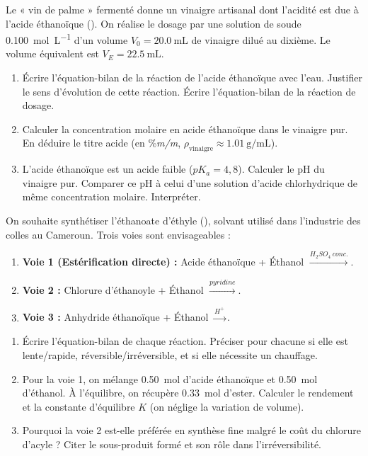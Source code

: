 \documentclass[11pt]{article}
\begin{document}
\begin{exercice}
Le « vin de palme » fermenté donne un vinaigre artisanal dont l'acidité est due à l'acide éthanoïque (). On réalise le dosage par une solution de soude  \SI{0,100}{\mol\per\liter} d'un volume $V_0 = \SI{20,0}{\milli\liter}$ de vinaigre dilué au dixième. Le volume équivalent est $V_E = \SI{22,5}{\milli\liter}$.
\begin{enumerate}
    \item Écrire l'équation-bilan de la réaction de l'acide éthanoïque avec l'eau. Justifier le sens d'évolution de cette réaction. Écrire l'équation-bilan de la réaction de dosage.
    \item Calculer la concentration molaire en acide éthanoïque dans le vinaigre pur. En déduire le titre acide (en \%\textit{m/m}, $\rho_{\text{vinaigre}} \approx \SI{1,01}{\gram\per\milli\liter}$).
    \item L'acide éthanoïque est un acide faible ($pK_a = 4,8$). Calculer le pH du vinaigre pur. Comparer ce pH à celui d'une solution d'acide chlorhydrique de même concentration molaire. Interpréter.
\end{enumerate}
\end{exercice}

\begin{exercice}
On souhaite synthétiser l'éthanoate d'éthyle (), solvant utilisé dans l'industrie des colles au Cameroun. Trois voies sont envisageables :
\begin{enumerate}
    \item \textbf{Voie 1 (Estérification directe) :} Acide éthanoïque + Éthanol $\xrightarrow{H_2SO_4\ conc.}$.
    \item \textbf{Voie 2 :} Chlorure d'éthanoyle + Éthanol $\xrightarrow{pyridine}$.
    \item \textbf{Voie 3 :} Anhydride éthanoïque + Éthanol $\xrightarrow{H^+}$.
\end{enumerate}
\begin{enumerate}
    \item Écrire l'équation-bilan de chaque réaction. Préciser pour chacune si elle est lente/rapide, réversible/irréversible, et si elle nécessite un chauffage.
    \item Pour la voie 1, on mélange \SI{0,50}{\mol} d'acide éthanoïque et \SI{0,50}{\mol} d'éthanol. À l'équilibre, on récupère \SI{0,33}{\mol} d'ester. Calculer le rendement et la constante d'équilibre $K$ (on néglige la variation de volume).
    \item Pourquoi la voie 2 est-elle préférée en synthèse fine malgré le coût du chlorure d'acyle ? Citer le sous-produit formé et son rôle dans l'irréversibilité.
\end{enumerate}
\end{exercice}
\end{document}
